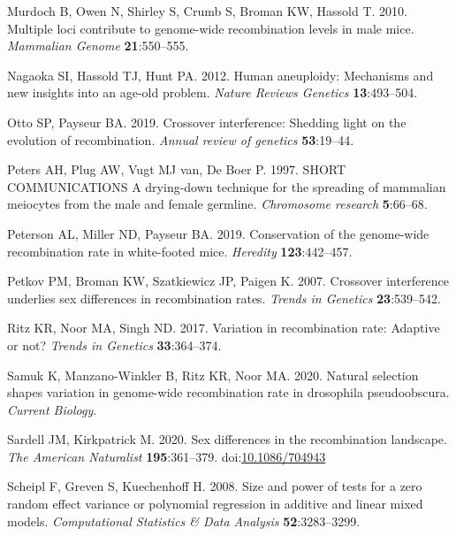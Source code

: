 \documentclass[
]{article}
\begin{document}
\leavevmode\hypertarget{ref-murdoch2010}{}%
Murdoch B, Owen N, Shirley S, Crumb S, Broman KW, Hassold T. 2010.
Multiple loci contribute to genome-wide recombination levels in male
mice. \emph{Mammalian Genome} \textbf{21}:550--555.

\leavevmode\hypertarget{ref-nagaoka2012}{}%
Nagaoka SI, Hassold TJ, Hunt PA. 2012. Human aneuploidy: Mechanisms and
new insights into an age-old problem. \emph{Nature Reviews Genetics}
\textbf{13}:493--504.

\leavevmode\hypertarget{ref-ottoPaysuer2019}{}%
Otto SP, Payseur BA. 2019. Crossover interference: Shedding light on the
evolution of recombination. \emph{Annual review of genetics}
\textbf{53}:19--44.

\leavevmode\hypertarget{ref-peters_1997}{}%
Peters AH, Plug AW, Vugt MJ van, De Boer P. 1997. SHORT COMMUNICATIONS A
drying-down technique for the spreading of mammalian meiocytes from the
male and female germline. \emph{Chromosome research} \textbf{5}:66--68.

\leavevmode\hypertarget{ref-peterson2019}{}%
Peterson AL, Miller ND, Payseur BA. 2019. Conservation of the
genome-wide recombination rate in white-footed mice. \emph{Heredity}
\textbf{123}:442--457.

\leavevmode\hypertarget{ref-petkov2007}{}%
Petkov PM, Broman KW, Szatkiewicz JP, Paigen K. 2007. Crossover
interference underlies sex differences in recombination rates.
\emph{Trends in Genetics} \textbf{23}:539--542.

\leavevmode\hypertarget{ref-Ritz2017}{}%
Ritz KR, Noor MA, Singh ND. 2017. Variation in recombination rate:
Adaptive or not? \emph{Trends in Genetics} \textbf{33}:364--374.

\leavevmode\hypertarget{ref-samuk2020}{}%
Samuk K, Manzano-Winkler B, Ritz KR, Noor MA. 2020. Natural selection
shapes variation in genome-wide recombination rate in drosophila
pseudoobscura. \emph{Current Biology}.

\leavevmode\hypertarget{ref-sardell_sex_2020}{}%
Sardell JM, Kirkpatrick M. 2020. Sex differences in the recombination
landscape. \emph{The American Naturalist} \textbf{195}:361--379.
doi:\href{https://doi.org/10.1086/704943}{10.1086/704943}

\leavevmode\hypertarget{ref-RLRsim}{}%
Scheipl F, Greven S, Kuechenhoff H. 2008. Size and power of tests for a
zero random effect variance or polynomial regression in additive and
linear mixed models. \emph{Computational Statistics \& Data Analysis}
\textbf{52}:3283--3299.
\end{document}
